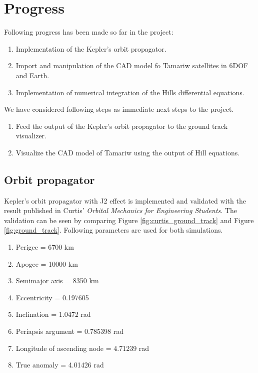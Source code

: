 \documentclass{article}
\begin{document}
\section{Progress}

Following progress has been made so far in the project:

\begin{enumerate}[noitemsep]
  \item Implementation of the Kepler's orbit propagator.
  \item Import and manipulation of the CAD model fo Tamariw satellites in 6DOF and Earth.
  \item Implementation of numerical integration of the Hills differential equations.
\end{enumerate}

We have considered following steps as immediate next steps to the project.

\begin{enumerate}[noitemsep]
  \item Feed the output of the Kepler's orbit propagator to the ground track visualizer.
  \item Visualize the CAD model of Tamariw using the output of Hill equations.
\end{enumerate}

\subsection{Orbit propagator}

Kepler's orbit propagator with J2 effect is implemented and validated with the result published in Curtis' \textit{Orbital Mechanics for Engineering Students}. The validation can be seen by comparing Figure \ref{fig:curtis_ground_track} and Figure \ref{fig:ground_track}. Following parameters are used for both simulations.

\begin{enumerate}[noitemsep]
  \item Perigee = 6700 km
  \item Apogee = 10000 km
  \item Semimajor axis = 8350 km
  \item Eccentricity = 0.197605
  \item Inclination = 1.0472 rad
  \item Periapsis argument = 0.785398 rad
  \item Longitude of ascending node = 4.71239 rad
  \item True anomaly = 4.01426 rad
\end{enumerate}
\end{document}
